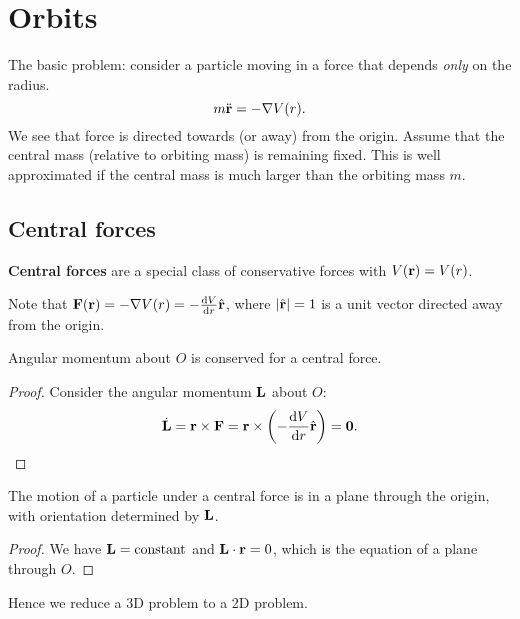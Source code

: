 \section{Orbits}
The basic problem: consider a particle moving in a force that depends \textit{only} on the radius.
\[
    m \ddot{{\bf r}} = - \nabla V(r).
\]
We see that force is directed towards (or away) from the origin. Assume that the central mass (relative to orbiting mass) is remaining fixed. This is well approximated if the central mass is much larger than the orbiting mass $m$.

\subsection{Central forces}
\begin{definition}
    \textbf{Central forces} are a special class of conservative forces with $ V({\bf r}) = V(r) $. 
\end{definition}
Note that $ {\bf F}({\bf r}) = - \nabla V(r) = -\frac{\mathrm{d}V}{\mathrm{d}r}\hat{{\bf r}}  $, where $ |\hat{{\bf r}}|=1 $ is a unit vector directed away from the origin.
\begin{center}
\end{center}

\begin{proposition}
    Angular momentum about $O$ is conserved for a central force.
\end{proposition}
\begin{proof}
    Consider the angular momentum ${\bf L}$ about $O$: 
    \[
        \dot{{\bf L}} = {\bf r} \times {\bf F} = {\bf r} \times \left( -\frac{\mathrm{d}V}{\mathrm{d}r} \hat{{\bf r}} \right) = \mathbf{0}.\qedhere
    \]
\end{proof}
\begin{proposition}
    The motion of a particle under a central force is in a plane through the origin, with orientation determined by ${\bf L}$.
\end{proposition}
\begin{proof}
    We have $ {\bf L} = \text{constant} $ and $ {\bf L} \cdot {\bf r}=0 $, which is the equation of a plane through $O$.
\end{proof}
Hence we reduce a 3D problem to a 2D problem.

